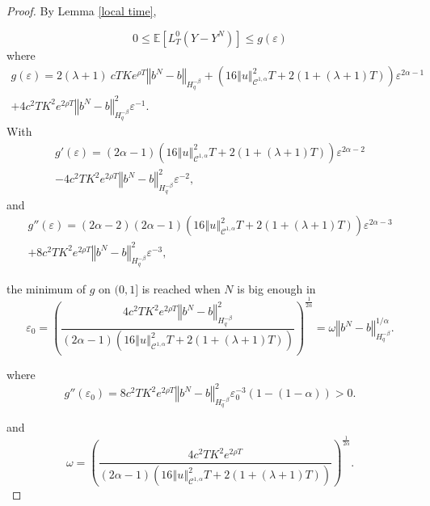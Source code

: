 \documentclass[12pt]{article}
\newcommand{\norme}[1]{\left\Vert #1\right\Vert}
\newcommand{\E}{\mathbb{E}}
\begin{document}
\begin{proof}
    By Lemma \ref{local time},
    
    \begin{equation*}
    0\leq\E\left[L^0_T(Y-Y^N)\right]\leq g(\varepsilon)
    \end{equation*}
    where \begin{multline*}
    g(\varepsilon) = 2(\lambda + 1)\ cT Ke^{\rho T}\norme{b^N-b}_{H^{-\beta}_{q}} + \left(16\norme{u}_{\mathcal{C}^{1,\alpha}}^2 T + 2(1+(\lambda + 1)T)\right) \varepsilon^{2\alpha-1}\\
    + 4c^2T K^2e^{2\rho T}\norme{b^N-b}_{H^{-\beta}_{q}}^2\varepsilon^{-1}.
    \end{multline*}    
    With \begin{multline*}
    g'(\varepsilon)=(2\alpha-1)\left(16\norme{u}_{\mathcal{C}^{1,\alpha}}^2 T + 2(1+(\lambda + 1)T)\right)\varepsilon^{2\alpha-2}\\-4c^2T K^2e^{2\rho T}\norme{b^N-b}_{H^{-\beta}_{q}}^2\varepsilon^{-2},
    \end{multline*}
    and 
    \begin{multline*}
    g''(\varepsilon)=(2\alpha-2)(2\alpha-1)\left(16\norme{u}_{\mathcal{C}^{1,\alpha}}^2 T + 2(1+(\lambda + 1)T)\right)\varepsilon^{2\alpha-3}\\+8c^2T K^2e^{2\rho T}\norme{b^N-b}_{H^{-\beta}_{q}}^2\varepsilon^{-3},\end{multline*}
    
    the minimum of $g$ on $(0,1]$ is reached when $N$ is big enough in \begin{equation*}
    \varepsilon_0=\left(\frac{4c^2T K^2e^{2\rho T}\norme{b^N-b}_{H^{-\beta}_{q}}^2}{(2\alpha-1)\left(16\norme{u}_{\mathcal{C}^{1,\alpha}}^2 T + 2(1+(\lambda + 1)T)\right)}\right)^{\frac{1}{2\alpha}}=\omega \norme{b^N-b}_{H^{-\beta}_{q}}^{1/\alpha}.
    \end{equation*}
    
    where 
    \begin{equation*}
    g''(\varepsilon_0)
    =8c^2T K^2e^{2\rho T}\norme{b^N-b}_{H^{-\beta}_{q}}^2\varepsilon_0^{-3}\left(1-(1-\alpha)\right)>0.
    \end{equation*}
    
    and \begin{equation*}
    \omega = \left(\frac{4c^2T K^2e^{2\rho T}}{(2\alpha-1)\left(16\norme{u}_{\mathcal{C}^{1,\alpha}}^2 T + 2(1+(\lambda + 1)T)\right)}\right)^{\frac{1}{2\alpha}}.
    \end{equation*}
    

\end{proof}
\end{document}
